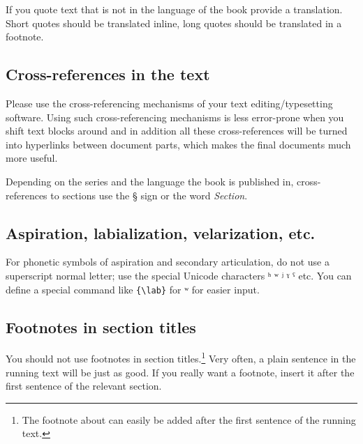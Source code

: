 {If you quote text that is not in the language of the book provide a translation. Short quotes should
be translated inline, long quotes should be translated in a footnote.




\subsection{Cross-references in the text}

Please use the cross-referencing mechanisms of your text editing/typesetting software. Using such
cross-referencing mechanisms is less error-prone when you shift text blocks around and in addition
all these cross-references will be turned into hyperlinks between document parts, which makes the
final documents much more useful.


 
Depending on the series and the language the book is published in, cross-references to sections use the § sign or the word \emph{Section}. 


\subsection{Aspiration, labialization, velarization, etc.}
For phonetic symbols of aspiration and secondary articulation, do not use a superscript normal letter; use the special Unicode characters ʰ ʷ ʲ ˠ ˤ etc. You can define a special command like \verb+{\lab}+ for ʷ for easier input. 

\subsection{Footnotes in section titles}\label{sec:footnote}
You should not use footnotes in section titles.\footnote{The footnote about  can easily be added after the first sentence of the running text.} Very often, a plain sentence in the running text will be just as good. If you really want a footnote, insert it after the first sentence of the relevant section.

}
